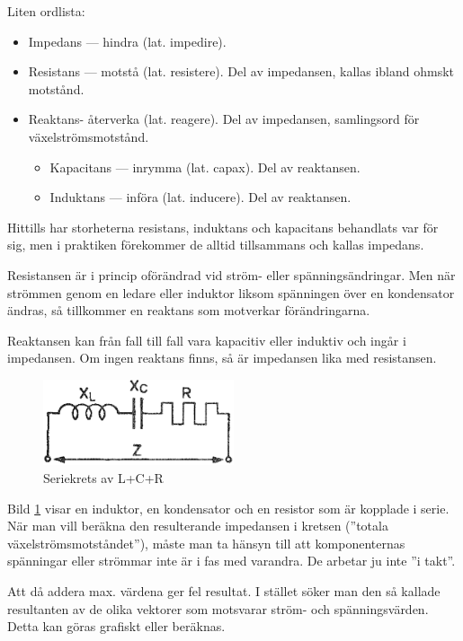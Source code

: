 Liten ordlista:
\begin{itemize}
\item Impedans --- hindra (lat. impedire).
\item Resistans --- motstå (lat. resistere).
  Del av impedansen, kallas ibland ohmskt motstånd.
\item Reaktans- återverka (lat. reagere).
  Del av impedansen, samlingsord för växelströmsmotstånd.
  \begin{itemize}
  \item Kapacitans --- inrymma (lat. capax). Del av reaktansen.
  \item Induktans --- införa (lat. inducere). Del av reaktansen.
  \end{itemize}
\end{itemize}

Hittills har storheterna resistans, induktans och kapacitans behandlats var för
sig, men i praktiken förekommer de alltid tillsammans och kallas impedans.

Resistansen är i princip oförändrad vid ström- eller spänningsändringar.
Men när strömmen genom en ledare eller induktor liksom spänningen över en
kondensator ändras, så tillkommer en reaktans som motverkar förändringarna.

Reaktansen kan från fall till fall vara kapacitiv eller induktiv och ingår i
impedansen.
Om ingen reaktans finns, så är impedansen lika med resistansen.

\begin{figure}
\includegraphics[width=0.5\textwidth]{images/cropped_pdfs/bild_2_3-12.pdf}
\caption{Seriekrets av L+C+R}
\label{fig:BildII3-12}
\end{figure}

Bild \ref{fig:BildII3-12} visar en induktor, en kondensator och en resistor
som är kopplade i serie.
När man vill beräkna den resulterande impedansen i kretsen
(''totala växelströmsmotståndet''), måste man ta hänsyn till att komponenternas
spänningar eller strömmar inte är i fas med varandra.
De arbetar ju inte ''i takt''.

Att då addera max. värdena ger fel resultat.
I stället söker man den så kallade resultanten av de olika vektorer som
motsvarar ström- och spänningsvärden.
Detta kan göras grafiskt eller beräknas.

